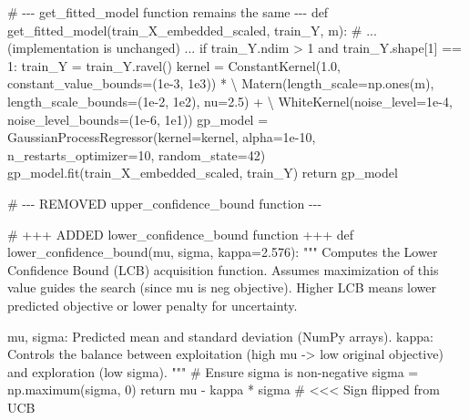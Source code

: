 \documentclass[
  letterpaper,
  DIV=11,
  numbers=noendperiod]{scrartcl}
\newenvironment{Shaded}{\begin{snugshade}}{\end{snugshade}}
\newcommand{\CommentTok}[1]{\textcolor[rgb]{0.37,0.37,0.37}{#1}}
\newcommand{\ControlFlowTok}[1]{\textcolor[rgb]{0.00,0.23,0.31}{#1}}
\newcommand{\DecValTok}[1]{\textcolor[rgb]{0.68,0.00,0.00}{#1}}
\newcommand{\FloatTok}[1]{\textcolor[rgb]{0.68,0.00,0.00}{#1}}
\newcommand{\KeywordTok}[1]{\textcolor[rgb]{0.00,0.23,0.31}{#1}}
\newcommand{\NormalTok}[1]{\textcolor[rgb]{0.00,0.23,0.31}{#1}}
\newcommand{\OperatorTok}[1]{\textcolor[rgb]{0.37,0.37,0.37}{#1}}
\begin{document}
\begin{Shaded}
\begin{Highlighting}[]
\CommentTok{\# {-}{-}{-} get\_fitted\_model function remains the same {-}{-}{-}}
\KeywordTok{def}\NormalTok{ get\_fitted\_model(train\_X\_embedded\_scaled, train\_Y, m):}
    \CommentTok{\# ... (implementation is unchanged) ...}
    \ControlFlowTok{if}\NormalTok{ train\_Y.ndim }\OperatorTok{\textgreater{}} \DecValTok{1} \KeywordTok{and}\NormalTok{ train\_Y.shape[}\DecValTok{1}\NormalTok{] }\OperatorTok{==} \DecValTok{1}\NormalTok{: train\_Y }\OperatorTok{=}\NormalTok{ train\_Y.ravel()}
\NormalTok{    kernel }\OperatorTok{=}\NormalTok{ ConstantKernel(}\FloatTok{1.0}\NormalTok{, constant\_value\_bounds}\OperatorTok{=}\NormalTok{(}\FloatTok{1e{-}3}\NormalTok{, }\FloatTok{1e3}\NormalTok{)) }\OperatorTok{*} \OperatorTok{\textbackslash{}}
\NormalTok{             Matern(length\_scale}\OperatorTok{=}\NormalTok{np.ones(m), length\_scale\_bounds}\OperatorTok{=}\NormalTok{(}\FloatTok{1e{-}2}\NormalTok{, }\FloatTok{1e2}\NormalTok{), nu}\OperatorTok{=}\FloatTok{2.5}\NormalTok{) }\OperatorTok{+} \OperatorTok{\textbackslash{}}
\NormalTok{             WhiteKernel(noise\_level}\OperatorTok{=}\FloatTok{1e{-}4}\NormalTok{, noise\_level\_bounds}\OperatorTok{=}\NormalTok{(}\FloatTok{1e{-}6}\NormalTok{, }\FloatTok{1e1}\NormalTok{))}
\NormalTok{    gp\_model }\OperatorTok{=}\NormalTok{ GaussianProcessRegressor(kernel}\OperatorTok{=}\NormalTok{kernel, alpha}\OperatorTok{=}\FloatTok{1e{-}10}\NormalTok{, n\_restarts\_optimizer}\OperatorTok{=}\DecValTok{10}\NormalTok{, random\_state}\OperatorTok{=}\DecValTok{42}\NormalTok{)}
\NormalTok{    gp\_model.fit(train\_X\_embedded\_scaled, train\_Y)}
    \ControlFlowTok{return}\NormalTok{ gp\_model}


\CommentTok{\# {-}{-}{-} REMOVED upper\_confidence\_bound function {-}{-}{-}}

\CommentTok{\# +++ ADDED lower\_confidence\_bound function +++}
\KeywordTok{def}\NormalTok{ lower\_confidence\_bound(mu, sigma, kappa}\OperatorTok{=}\FloatTok{2.576}\NormalTok{):}
    \CommentTok{"""}
\CommentTok{    Computes the Lower Confidence Bound (LCB) acquisition function.}
\CommentTok{    Assumes maximization of this value guides the search (since mu is neg objective).}
\CommentTok{    Higher LCB means lower predicted objective or lower penalty for uncertainty.}

\CommentTok{    mu, sigma: Predicted mean and standard deviation (NumPy arrays).}
\CommentTok{    kappa: Controls the balance between exploitation (high mu {-}\textgreater{} low original objective)}
\CommentTok{           and exploration (low sigma).}
\CommentTok{    """}
    \CommentTok{\# Ensure sigma is non{-}negative}
\NormalTok{    sigma }\OperatorTok{=}\NormalTok{ np.maximum(sigma, }\DecValTok{0}\NormalTok{)}
    \ControlFlowTok{return}\NormalTok{ mu }\OperatorTok{{-}}\NormalTok{ kappa }\OperatorTok{*}\NormalTok{ sigma }\CommentTok{\# \textless{}\textless{}\textless{} Sign flipped from UCB}



\end{Highlighting}
\end{Shaded}
\end{document}
